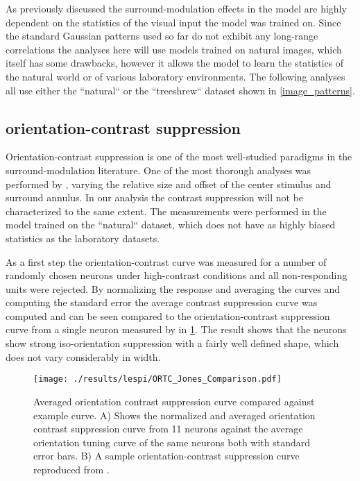 As previously discussed the surround-modulation effects in the model
are highly dependent on the statistics of the visual input the model
was trained on. Since the standard Gaussian patterns used so far do
not exhibit any long-range correlations the analyses here will use
models trained on natural images, which itself has some drawbacks,
however it allows the model to learn the statistics of the natural
world or of various laboratory environments. The following analyses
all use either the ``natural`` or the ``treeshrew`` dataset shown in
\ref{image_patterns}.

\subsection{orientation-contrast suppression}

Orientation-contrast suppression is one of the most well-studied
paradigms in the surround-modulation literature. One of the most
thorough analyses was performed by \cite{Jones2002}, varying the
relative size and offset of the center stimulus and surround
annulus. In our analysis the contrast suppression will not be
characterized to the same extent. The measurements were performed in
the model trained on the ``natural`` dataset, which does not have as
highly biased statistics as the laboratory datasets.

As a first step the orientation-contrast curve was measured for a
number of randomly chosen neurons under high-contrast conditions and
all non-responding units were rejected. By normalizing the response
and averaging the curves and computing the standard error the average
contrast suppression curve was computed and can be seen compared to
the orientation-contrast suppression curve from a single neuron
measured by \cite{Jones2002} in \ref{ORTC_Jones}. The result shows
that the neurons show strong iso-orientation suppression with a fairly
well defined shape, which does not vary considerably in width.

\begin{figure}
	\centering
        \texttt{[image: ./results/lespi/ORTC\_Jones\_Comparison.pdf]}
	\caption[Averaged orientation-contrast suppression curve compared
      against \cite{Jones2002} example curve.]{Averaged orientation
      contrast suppression curve compared against \cite{Jones2002}
      example curve. A) Shows the normalized and averaged orientation
      contrast suppression curve from 11 neurons against the average
      orientation tuning curve of the same neurons both with standard
      error bars. B) A sample orientation-contrast suppression curve
      reproduced from \cite{Jones2002}.}
	\label{ORTC_Jones}
\end{figure}

